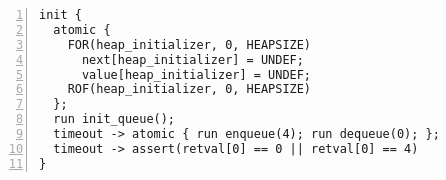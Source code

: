 \begin{Verbatim}[numbers=left]
init {
  atomic {
    FOR(heap_initializer, 0, HEAPSIZE)
      next[heap_initializer] = UNDEF;
      value[heap_initializer] = UNDEF;
    ROF(heap_initializer, 0, HEAPSIZE)
  };
  run init_queue();
  timeout -> atomic { run enqueue(4); run dequeue(0); };
  timeout -> assert(retval[0] == 0 || retval[0] == 4)
}
\end{Verbatim}